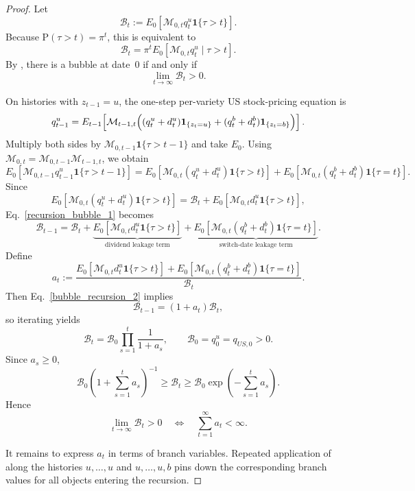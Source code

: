 \documentclass{article}
\begin{document}
\begin{proof}
Let
\[
\mathcal B_t
:=
E_0\!\left[\mathcal M_{0,t}q_t^u\mathbf 1\{\tau>t\}\right].
\]
Because $\mathrm{P}(\tau>t)=\pi^t$, this is equivalent to
\[
\mathcal B_t
=
\pi^t E_0\!\left[\mathcal M_{0,t}q_t^u\mid \tau>t\right].
\]
By , there is a bubble at date~0 if and only if
\[
\lim_{t\to\infty}\mathcal B_t>0.
\]

On histories with $z_{t-1}=u$, the one-step per-variety US stock-pricing equation is
\[
q_{t-1}^u
=
E_{t-1}\!\left[\mathcal M_{t-1,t}
\Bigl(
(q_t^u+d_t^u)\mathbf 1_{\{z_t=u\}}
+
(q_t^b+d_t^b)\mathbf 1_{\{z_t=b\}}
\Bigr)\right].
\]
Multiply both sides by $\mathcal M_{0,t-1}\mathbf 1\{\tau>t-1\}$ and take $E_0$. Using $\mathcal M_{0,t}=\mathcal M_{0,t-1}\mathcal M_{t-1,t}$, we obtain
\begin{equation}\label{recursion_bubble_1}
E_0\!\left[\mathcal M_{0,t-1}q_{t-1}^u\mathbf 1\{\tau>t-1\}\right]
=
E_0\!\left[\mathcal M_{0,t}(q_t^u+d_t^u)\mathbf 1\{\tau>t\}\right]
+
E_0\!\left[\mathcal M_{0,t}(q_t^b+d_t^b)\mathbf 1\{\tau=t\}\right].
\end{equation}
Since
\[
E_0\!\left[\mathcal M_{0,t}(q_t^u+d_t^u)\mathbf 1\{\tau>t\}\right]
=
\mathcal B_t
+
E_0\!\left[\mathcal M_{0,t}d_t^u\mathbf 1\{\tau>t\}\right],
\]
Eq.~\eqref{recursion_bubble_1} becomes
\begin{equation}\label{bubble_recursion_2}
\mathcal B_{t-1}
=
\mathcal B_t
+
\underbrace{E_0\!\left[\mathcal M_{0,t}d_t^u\mathbf 1\{\tau>t\}\right]}_{\text{dividend leakage term}}
+
\underbrace{E_0\!\left[\mathcal M_{0,t}(q_t^b+d_t^b)\mathbf 1\{\tau=t\}\right]}_{\text{switch-date leakage term}}.
\end{equation}
Define
\[
a_t
:=
\frac{
E_0\!\left[\mathcal M_{0,t}d_t^u\mathbf 1\{\tau>t\}\right]
+
E_0\!\left[\mathcal M_{0,t}(q_t^b+d_t^b)\mathbf 1\{\tau=t\}\right]
}{
\mathcal B_t
}.
\]
Then Eq.~\eqref{bubble_recursion_2} implies
\[
\mathcal B_{t-1}=(1+a_t)\mathcal B_t,
\]
so iterating yields
\[
\mathcal B_t
=
\mathcal B_0\prod_{s=1}^t\frac{1}{1+a_s},
\qquad
\mathcal B_0=q_0^u=q_{US,0}>0.
\]
Since $a_s\ge 0$,
\[
\mathcal B_0\left(1+\sum_{s=1}^t a_s\right)^{-1}
\ge
\mathcal B_t
\ge
\mathcal B_0\exp\!\left(-\sum_{s=1}^t a_s\right).
\]
Hence
\[
\lim_{t\to\infty}\mathcal B_t>0
\quad\Longleftrightarrow\quad
\sum_{t=1}^\infty a_t<\infty.
\]

It remains to express $a_t$ in terms of branch variables.
Repeated application of  along the histories $u,\ldots,u$ and $u,\ldots,u,b$ pins down the corresponding branch values for all objects entering the recursion.


\end{proof}
\end{document}
